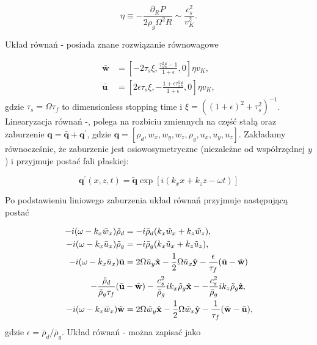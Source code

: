 \begin{equation}
\eta \equiv - \frac{\partial_R P}{2\rho_g\Omega^2 R} \sim \frac{c_s^2}{v_K^2}.
\end{equation}

Układ równań - posiada znane rozwiązanie równowagowe~\citep{N86}

\begin{align}
\bar{\mathbf{w}} &= \left[ 
 -2\tau_s\xi, \frac{\tau_s^2\xi - 1}{1+\epsilon},
 0
\right]\eta v_K, \label{eq:w0}\\
\bar{\mathbf{u}} &= \left[ 
 2\epsilon\tau_s\xi, -\frac{1 + \epsilon\tau_s^2\xi}{1+\epsilon},
 0
\right]\eta v_K, \label{eq:u0}
\end{align}
%
gdzie $\tau_s = \Omega \tau_f$ to dimensionless stopping time i 
$\xi = ((1+\epsilon)^2 + \tau_s^2)^{-1}$. 
Linearyzacja równań -, polega na rozbiciu zmiennych na
część stałą oraz zaburzenie $\mathbf{q} = \bar{\mathbf{q}} + \mathbf{q}^\prime$,
gdzie $\mathbf{q}=[\rho_d, w_x, w_y, w_z, \rho_g, u_x, u_y, u_z]$. Zakładamy
równocześnie, że zaburzenie jest osiowosymetryczne (niezależne od współrzędnej $y$)
i przyjmuje postać fali płaskiej:

\begin{equation}
   \label{eq:planar}
   \mathbf{q}^\prime(x,z,t) = \tilde{\mathbf{q}}
 \exp\left[i(k_x x + k_z z -\omega t)\right]
\end{equation}

Po podstawieniu liniowego zaburzenia układ równań przyjmuje następującą postać

\begin{align}
-i(\omega- k_x\bar{w}_x)\tilde{\rho}_d &= 
 - i \bar{\rho}_d(k_x\tilde{w}_x + k_z\tilde{w}_z), \label{lin1}\\
-i(\omega- k_x\bar{u}_x)\tilde{\rho}_g &= 
 - i \bar{\rho}_g(k_x\tilde{u}_x + k_z\tilde{u}_z), \label{lin2}\\
-i(\omega- k_x\bar{u}_x)\tilde{\mathbf{u}} &= 
 2\Omega \tilde{u}_y\hat{\mathbf{x}} - \frac{1}{2}\Omega \tilde{u}_x
 \hat{\mathbf{y}}
 -\frac{\epsilon}{\tau_f}(\tilde{\mathbf{u}} - \tilde{\mathbf{w}}) \notag\\
  -\frac{\tilde{\rho}_d}{\bar{\rho}_g\tau_f}
  (\bar{\mathbf{u}} &- \bar{\mathbf{w}})
  - \frac{c_s^2}{\bar{\rho}_g}ik_x\tilde{\rho}_g\hat{\mathbf{x}} -
  - \frac{c_s^2}{\bar{\rho}_g}ik_z\tilde{\rho}_g\hat{\mathbf{z}}, \label{lin3}\\
-i(\omega- k_x\bar{w}_x)\tilde{\mathbf{w}} &= 
 2\Omega \tilde{w}_y\hat{\mathbf{x}} - \frac{1}{2}\Omega \tilde{w}_x
 \hat{\mathbf{y}} 
 - \frac{1}{\tau_f} (\tilde{\mathbf{w}} - \tilde{\mathbf{u}}), \label{lin4}
\end{align}
%
gdzie $\epsilon = \bar{\rho}_d/\bar{\rho}_g$. Układ równań
- można zapisać jako

